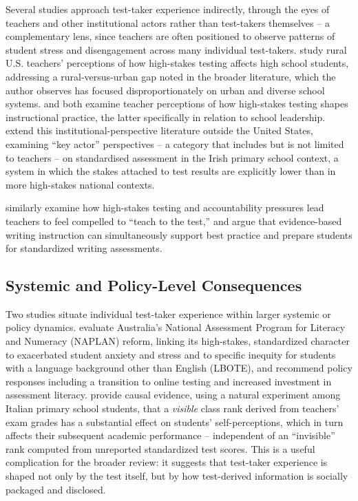 \documentclass[11pt]{article}
\begin{document}
Several studies approach test-taker experience indirectly, through the eyes of teachers and other institutional actors rather than test-takers themselves -- a complementary lens, since teachers are often positioned to observe patterns of student stress and disengagement across many individual test-takers. \citet{steuart2024ruralteachers} study rural U.S. teachers' perceptions of how high-stakes testing affects high school students, addressing a rural-versus-urban gap noted in the broader literature, which the author observes has focused disproportionately on urban and diverse school systems. \citet{weick2024instruction} and \citet{reese2004teachersperceptions} both examine teacher perceptions of how high-stakes testing shapes instructional practice, the latter specifically in relation to school leadership. \citet{mccauley2021irish} extend this institutional-perspective literature outside the United States, examining ``key actor'' perspectives -- a category that includes but is not limited to teachers -- on standardised assessment in the Irish primary school context, a system in which the stakes attached to test results are explicitly lower than in more high-stakes national contexts.

\citet{higgins2006teachingtest} similarly examine how high-stakes testing and accountability pressures lead teachers to feel compelled to ``teach to the test,'' and argue that evidence-based writing instruction can simultaneously support best practice and prepare students for standardized writing assessments.

\subsection{Systemic and Policy-Level Consequences}

Two studies situate individual test-taker experience within larger systemic or policy dynamics. \citet{zhangw2024naplan} evaluate Australia's National Assessment Program for Literacy and Numeracy (NAPLAN) reform, linking its high-stakes, standardized character to exacerbated student anxiety and stress and to specific inequity for students with a language background other than English (LBOTE), and recommend policy responses including a transition to online testing and increased investment in assessment literacy. \citet{ladant2023saliency} provide causal evidence, using a natural experiment among Italian primary school students, that a \emph{visible} class rank derived from teachers' exam grades has a substantial effect on students' self-perceptions, which in turn affects their subsequent academic performance -- independent of an ``invisible'' rank computed from unreported standardized test scores. This is a useful complication for the broader review: it suggests that test-taker experience is shaped not only by the test itself, but by how test-derived information is socially packaged and disclosed.
\end{document}

